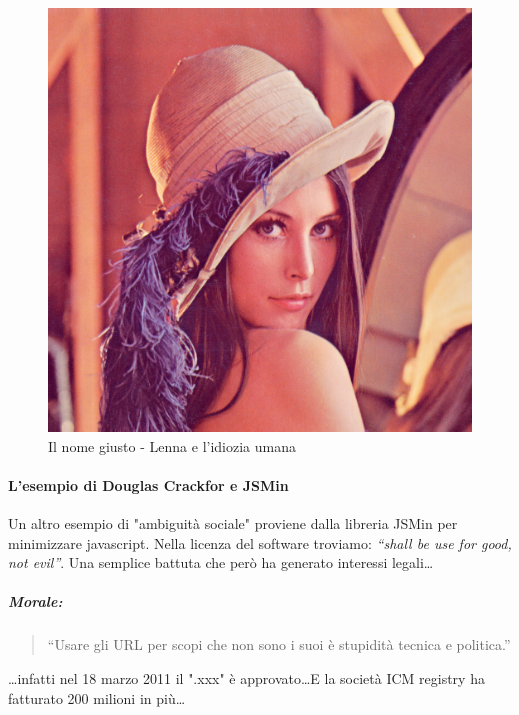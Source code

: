 				\begin{figure} [h]
					\centering
					\includegraphics[scale=0.25]{images/IlNomeGiusto-IdioziaUmana}
					\caption{Il nome giusto - Lenna e l'idiozia umana}
					\label{fig:IlNomeGiusto-IdioziaUmana}
				\end{figure}
			
			\paragraph{L'esempio di Douglas Crackfor e JSMin}
				Un altro esempio di "ambiguità sociale" proviene dalla libreria JSMin per minimizzare javascript. Nella licenza del software troviamo: \emph{``shall be use for good, not evil''}. Una semplice battuta che però ha generato interessi legali\dots
			
			\subparagraph*{Morale:}
			\begin{quote}
				``Usare gli URL per scopi che non sono i suoi è stupidità tecnica e politica.''
			\end{quote}
			\dots infatti nel 18 marzo 2011 il ".xxx" è approvato\dots E la società ICM registry ha fatturato 200 milioni in più\dots